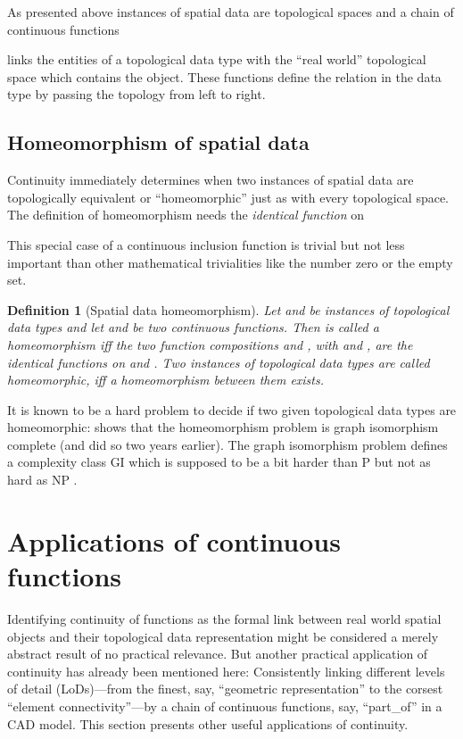 \documentclass[5p]{elsarticle}
\newtheorem{dfn}{Definition}
\newcommand{\qq}[1]{``#1''}
\begin{document}
As presented above instances of spatial data are topological spaces and a chain of continuous 
functions 

links the entities  of a topological data type  with the \qq{real world} topological 
space  which contains the object. These functions define the relation  in the 
data type by passing the topology from left to right. 

\subsection{Homeomorphism of spatial data} 

Continuity immediately determines when two instances of spatial data are 
topologically equivalent or \qq{homeomorphic} just as with every topological space. 
The definition of homeomorphism needs the \emph{identical function} on  

This special case of a continuous inclusion function is trivial but not 
less important than other mathematical trivialities like the number zero or the empty set. 

\begin{sloppy} \begin{dfn}[Spatial data homeomorphism] Let  and  be instances of topological 
data types and let 
 and 
 be two continuous functions. 
Then  is called a \emph{homeomorphism} iff the two function compositions 
 and , with  and , 
are the identical functions on  and . 
Two instances of topological data types are called \emph{homeomorphic}, iff a homeomorphism 
between them exists.
\end{dfn}
\end{sloppy} 

It is known to be a hard problem to decide if two given topological data types are homeomorphic: 
\cite{PaulDiss} shows that the homeomorphism problem is graph 
isomorphism complete (and \cite{BrettoEtAl:CompatibleTopologies} did so two years earlier). 
The graph isomorphism problem defines a complexity class GI which is supposed to be a bit harder 
than P but not as hard as NP \cite{Hoffmann:GI}. 

\section{Applications of continuous functions}\label{sec:applications}

Identifying continuity of functions as the formal link between real world spatial objects and 
their topological data representation might be considered a merely abstract result of no 
practical relevance. 
But another practical application of continuity has already been mentioned here: 
Consistently linking different levels of detail (LoDs)---from the finest, say,  
\qq{geometric representation} to the corsest \qq{element connectivity}---by 
a chain of continuous functions, say, \qq{part\_of} in a CAD model. 
This section presents other useful applications of continuity. 
\end{document}
